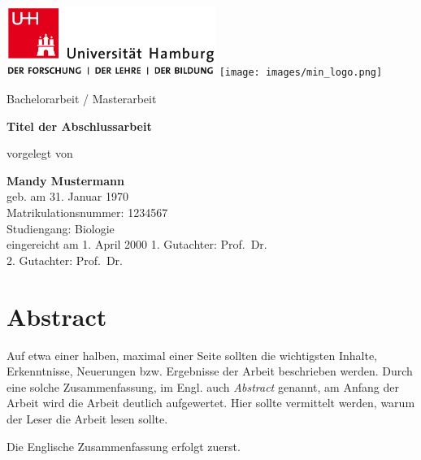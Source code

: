 \documentclass[a4paper,12pt]{article}
\begin{document}
\thispagestyle{empty}
\begin{titlepage}

\includegraphics[width=6.8cm]{images/uhh_logo.png}
\hspace{2cm}
\texttt{[image: images/min\_logo.png]}
\begin{center}\Large
  \vfill
	Bachelorarbeit / Masterarbeit
	\vfill
	\makeatletter
	{\LARGE\textsf{\textbf{Titel der Abschlussarbeit}}\par}
	\makeatother
	\vfill
  vorgelegt von \\\vspace{0.5cm}
  \par\bigskip
	\makeatletter
  \textbf{Mandy Mustermann} \\
  \makeatother
  geb. am 31. Januar 1970 \\
  Matrikulationsnummer: 1234567 \\
  Studiengang: Biologie \\
  \vfill
	\makeatletter
	eingereicht am 1. April 2000
	\makeatother
	\vfill
  1. Gutachter: Prof.~Dr. \\
  2. Gutachter: Prof.~Dr. \\

\end{center}
\end{titlepage}

\newpage
\hypertarget{abstract}{%
\section*{Abstract}\label{abstract}}

Auf etwa einer halben, maximal einer Seite sollten die wichtigsten Inhalte, Erkenntnisse, Neuerungen bzw. Ergebnisse der Arbeit beschrieben werden.
Durch eine solche Zusammenfassung, im Engl. auch \emph{Abstract} genannt, am Anfang der Arbeit wird die Arbeit deutlich aufgewertet. Hier sollte vermittelt werden, warum der Leser die Arbeit lesen sollte.

Die Englische Zusammenfassung erfolgt zuerst.
\pagestyle{plain}
\setcounter{page}{1}    		%
\end{document}
